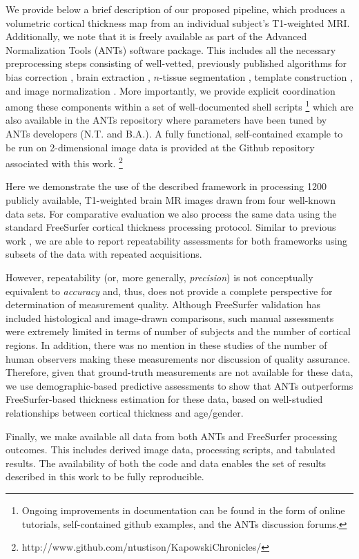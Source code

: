 We provide below a brief description of our proposed pipeline, which produces a volumetric
cortical thickness map from an individual subject's T1-weighted MRI.
Additionally, we note that it is freely available as part of the Advanced Normalization Tools
(ANTs) software package.  This includes all the necessary preprocessing steps consisting
of well-vetted, previously published algorithms for bias correction \citep{tustison2010},
brain extraction \citep{avants2010a}, $n$-tissue segmentation \citep{avants2011a},
template construction \citep{avants2010}, and image normalization \citep{avants2011}.
More importantly, we provide explicit coordination among
these components within a set of well-documented shell scripts%
\footnote{
Ongoing improvements in documentation can be found in the form of online tutorials, 
self-contained github examples, and the ANTs discussion forums.
}
which are also available in the ANTs repository where parameters have been tuned
by ANTs developers (N.T. and B.A.).
  A fully functional, self-contained example
 to be run on 2-dimensional image data is provided
at the Github repository associated with this work.%
\footnote{
http://www.github.com/ntustison/KapowskiChronicles/
}

Here we demonstrate the use of the described framework
in processing 1200 publicly available, T1-weighted brain MR images drawn from
four well-known data sets.
For comparative evaluation we also process the same data using the
standard FreeSurfer cortical thickness processing protocol.  
Similar to previous work \citep[e.g.,][]{clarkson2011}, we are able to 
report repeatability assessments for both frameworks using subsets of the data 
with repeated acquisitions.  

However, repeatability (or, more generally, {\it precision}) is not conceptually equivalent to {\it accuracy} and, thus, does not provide a complete perspective for determination of measurement quality.  Although FreeSurfer validation has included histological \citep{rosas2002} and image-drawn \citep{kuperberg2003} comparisons, such manual assessments were extremely limited in terms of number of subjects and the number of cortical regions.  In addition, there was no mention in these studies 
of the number of human observers making these measurements nor discussion of quality assurance.  Therefore, given that ground-truth
measurements are not available for these data, we use demographic-based
predictive assessments to show that ANTs outperforms FreeSurfer-based
thickness estimation for these data, based on well-studied relationships between
cortical thickness and age/gender.

Finally, we make available all data from both ANTs and FreeSurfer 
processing outcomes.  This includes derived image data, processing scripts, 
and tabulated results.  The availability of both the code and data enables
the set of results described in this work to be fully reproducible.  




